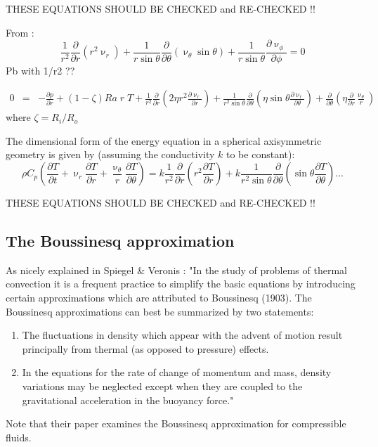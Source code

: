 THESE EQUATIONS SHOULD BE CHECKED and RE-CHECKED !!



From \cite{zebi93}:
\begin{equation}
\frac{1}{r^2} \frac{\partial}{\partial r} (r^2 \upnu_r) + 
\frac{1}{r \sin \theta} \frac{\partial}{\partial \theta} (\upnu_\theta \sin \theta)+
\frac{1}{r \sin \theta} \frac{\partial \upnu_\phi}{\partial \phi} = 0
\end{equation}
Pb with 1/r2 ??

\begin{eqnarray}
0 &=& -\frac{\partial p}{\partial r} + (1-\zeta) Ra \; r \; T + 
\frac{1}{r^2}\frac{\partial}{\partial r} \left( 2 \eta r^2 \frac{\partial \upnu_r}{\partial r} \right)
+ \frac{1}{r^2 \sin\theta} \frac{\partial}{\partial\theta} 
\left( \eta \sin\theta \frac{\partial \upnu_r}{\partial\theta} \right)
+\frac{\partial}{\partial \theta} \left(\eta \frac{\partial}{\partial r} \frac{\upnu_\theta}{r} \right)
\end{eqnarray}
where $\zeta=R_i/R_o$


The dimensional form of the energy equation in a spherical axisymmetric geometry is given by
(assuming the conductivity $k$ to be constant):
\[
\rho C_p \left( \frac{\partial T}{\partial t}  + 
\upnu_r \frac{\partial T}{\partial r} + \frac{\upnu_\theta}{r} \frac{\partial T}{\partial \theta}
\right)
=
k \frac{1}{r^2} \frac{\partial}{\partial r} \left( r^2 \frac{\partial T}{\partial r} \right)
+
k \frac{1}{r^2 \sin\theta} 
\frac{\partial}{\partial \theta} \left( \sin\theta \frac{\partial T}{\partial \theta}  \right) 
...
\]

THESE EQUATIONS SHOULD BE CHECKED and RE-CHECKED !!





\newpage
\subsection{The Boussinesq approximation}

As nicely explained in Spiegel \& Veronis \cite{spve60}: "In the study of problems of thermal convection it is a frequent practice to simplify the basic equations by introducing certain approximations which are attributed to
Boussinesq (1903). The Boussinesq approximations can best be summarized by two
statements: 
\begin{enumerate}
\item The fluctuations in density which appear with the advent of motion
result principally from thermal (as opposed to pressure) effects. 
\item In the equations
for the rate of change of momentum and mass, density variations may be neglected except
when they are coupled to the gravitational acceleration in the buoyancy force."
\end{enumerate}
Note that their paper examines the Boussinesq approximation for compressible fluids.  

